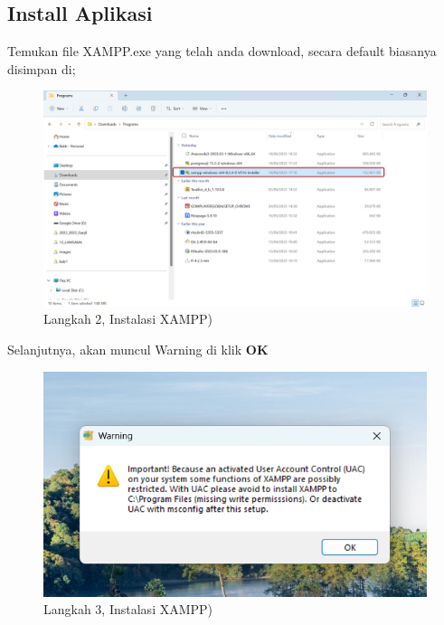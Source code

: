 \documentclass[
]{book}
\begin{document}
\hypertarget{install-aplikasi}{%
\subsection{Install Aplikasi}\label{install-aplikasi}}

Temukan file XAMPP.exe yang telah anda download, secara default biasanya disimpan di;

\begin{figure}

{\centering \includegraphics[width=1\linewidth]{./images/Bab1/xampp1} 

}

\caption{Langkah 2, Instalasi XAMPP)}\label{fig:install-xammp}
\end{figure}

Selanjutnya, akan muncul Warning di klik \textbf{OK}

\begin{figure}

{\centering \includegraphics[width=1\linewidth]{./images/Bab1/xampp2} 

}

\caption{Langkah 3, Instalasi XAMPP)}\label{fig:install-xammp2}
\end{figure}
\end{document}
